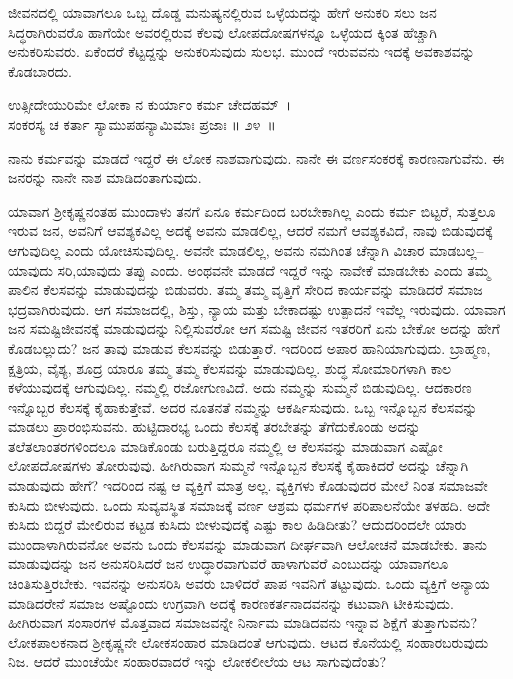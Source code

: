 ಜೀವನದಲ್ಲಿ ಯಾವಾಗಲೂ ಒಬ್ಬ ದೊಡ್ಡ ಮನುಷ್ಯನಲ್ಲಿರುವ ಒಳ್ಳೆಯದನ್ನು ಹೇಗೆ ಅನುಕರಿ ಸಲು ಜನ ಸಿದ್ಧರಾಗಿರುವರೊ ಹಾಗೆಯೇ ಅವರಲ್ಲಿರುವ ಕೆಲವು ಲೋಪದೋಷಗಳನ್ನೂ ಒಳ್ಳೆಯದ ಕ್ಕಿಂತ ಹೆಚ್ಚಾಗಿ ಅನುಕರಿಸುವರು. ಏಕೆಂದರೆ ಕೆಟ್ಟದ್ದನ್ನು ಅನುಕರಿಸುವುದು ಸುಲಭ. ಮುಂದೆ ಇರುವವನು ಇದಕ್ಕೆ ಅವಕಾಶವನ್ನು ಕೊಡಬಾರದು.

\begin{shloka}
ಉತ್ಸೀದೇಯುರಿಮೇ ಲೋಕಾ ನ ಕುರ್ಯಾಂ ಕರ್ಮ ಚೇದಹಮ್~।\\ಸಂಕರಸ್ಯ ಚ ಕರ್ತಾ ಸ್ಯಾಮುಪಹನ್ಯಾಮಿಮಾಃ ಪ್ರಜಾಃ \hfill॥ ೨೪~॥
\end{shloka}

\newpage

\begin{artha}
ನಾನು ಕರ್ಮವನ್ನು ಮಾಡದೆ ಇದ್ದರೆ ಈ ಲೋಕ ನಾಶವಾಗುವುದು. ನಾನೇ ಈ ವರ್ಣ\-ಸಂಕರಕ್ಕೆ ಕಾರಣನಾಗುವೆನು. ಈ ಜನರನ್ನು ನಾನೇ ನಾಶ ಮಾಡಿದಂತಾಗುವುದು.
\end{artha}

ಯಾವಾಗ ಶ‍್ರೀಕೃಷ್ಣನಂತಹ ಮುಂದಾಳು ತನಗೆ ಏನೂ ಕರ್ಮದಿಂದ ಬರಬೇಕಾಗಿಲ್ಲ ಎಂದು ಕರ್ಮ ಬಿಟ್ಟರೆ, ಸುತ್ತಲೂ ಇರುವ ಜನ, ಅವನಿಗೆ ಆವಶ್ಯಕವಿಲ್ಲ ಅದಕ್ಕೆ ಅವನು ಮಾಡಲಿಲ್ಲ, ಆದರೆ ನಮಗೆ ಆವಶ್ಯಕವಿದೆ, ನಾವು ಬಿಡುವುದಕ್ಕೆ ಆಗುವುದಿಲ್ಲ ಎಂದು ಯೋಚಿಸುವುದಿಲ್ಲ. ಅವನೇ ಮಾಡಲಿಲ್ಲ, ಅವನು ನಮಗಿಂತ ಚೆನ್ನಾಗಿ ವಿಚಾರ ಮಾಡಬಲ್ಲ–ಯಾವುದು ಸರಿ,\break ಯಾವುದು ತಪ್ಪು ಎಂದು. ಅಂಥವನೇ ಮಾಡದೆ ಇದ್ದರೆ ಇನ್ನು ನಾವೇಕೆ ಮಾಡಬೇಕು ಎಂದು ತಮ್ಮ ಪಾಲಿನ ಕೆಲಸವನ್ನು ಮಾಡುವುದನ್ನು ಬಿಡುವರು. ತಮ್ಮ ತಮ್ಮ ವೃತ್ತಿಗೆ ಸೇರಿದ ಕಾರ್ಯವನ್ನು ಮಾಡಿದರೆ ಸಮಾಜ ಭದ್ರವಾಗಿರುವುದು. ಆಗ ಸಮಾಜದಲ್ಲಿ, ಶಿಸ್ತು, ನ್ಯಾಯ ಮತ್ತು ಬೇಕಾದಷ್ಟು ಉತ್ಪಾದನೆ ಇವೆಲ್ಲ ಇರುವುದು. ಯಾವಾಗ ಜನ ಸಮಷ್ಟಿಜೀವನಕ್ಕೆ ಮಾಡುವುದನ್ನು ನಿಲ್ಲಿಸುವರೋ ಆಗ ಸಮಷ್ಟಿ ಜೀವನ ಇತರರಿಗೆ ಏನು ಬೇಕೋ ಅದನ್ನು ಹೇಗೆ ಕೊಡಬಲ್ಲುದು? ಜನ ತಾವು ಮಾಡುವ ಕೆಲಸವನ್ನು ಬಿಡುತ್ತಾರೆ. ಇದರಿಂದ ಅಪಾರ ಹಾನಿಯಾಗುವುದು. ಬ್ರಾಹ್ಮಣ, ಕ್ಷತ್ರಿಯ, ವೈಶ್ಯ, ಶೂದ್ರ ಯಾರೂ ತಮ್ಮ ತಮ್ಮ ಕೆಲಸವನ್ನು ಮಾಡುವುದಿಲ್ಲ. ಶುದ್ಧ ಸೋಮಾರಿಗಳಾಗಿ ಕಾಲ ಕಳೆಯುವುದಕ್ಕೆ ಆಗುವುದಿಲ್ಲ. ನಮ್ಮಲ್ಲಿ ರಜೋಗುಣವಿದೆ. ಅದು ನಮ್ಮನ್ನು ಸುಮ್ಮನೆ ಬಿಡುವುದಿಲ್ಲ. ಆದಕಾರಣ ಇನ್ನೊಬ್ಬರ ಕೆಲಸಕ್ಕೆ ಕೈಹಾಕುತ್ತೇವೆ. ಅದರ ನೂತನತೆ ನಮ್ಮನ್ನು ಆಕರ್ಷಿಸುವುದು. ಒಬ್ಬ ಇನ್ನೊಬ್ಬನ ಕೆಲಸವನ್ನು ಮಾಡಲು ಪ್ರಾರಂಭಿಸುವನು. ಹುಟ್ಟಿದಾರಭ್ಯ ಒಂದು ಕೆಲಸಕ್ಕೆ ತರಬೇತನ್ನು ತೆಗೆದುಕೊಂಡು ಅದನ್ನು ತಲೆತಲಾಂತರಗಳಿಂದಲೂ ಮಾಡಿಕೊಂಡು ಬರುತ್ತಿದ್ದರೂ ನಮ್ಮಲ್ಲಿ ಆ ಕೆಲಸವನ್ನು ಮಾಡುವಾಗ ಎಷ್ಟೋ ಲೋಪದೋಷಗಳು ತೋರುವುವು. ಹೀಗಿರುವಾಗ ಸುಮ್ಮನೆ ಇನ್ನೊಬ್ಬನ ಕೆಲಸಕ್ಕೆ ಕೈಹಾಕಿದರೆ ಅದನ್ನು ಚೆನ್ನಾಗಿ ಮಾಡುವುದು ಹೇಗೆ? ಇದರಿಂದ ನಷ್ಟ ಆ ವ್ಯಕ್ತಿಗೆ ಮಾತ್ರ ಅಲ್ಲ. ವ್ಯಕ್ತಿಗಳು ಕೊಡುವುದರ ಮೇಲೆ ನಿಂತ ಸಮಾಜವೇ ಕುಸಿದು ಬೀಳುವುದು. ಒಂದು ಸುವ್ಯವಸ್ಥಿತ ಸಮಾಜಕ್ಕೆ ವರ್ಣ ಆಶ್ರಮ ಧರ್ಮಗಳ ಪರಿಪಾಲನೆಯೇ ತಳಹದಿ. ಅದೇ ಕುಸಿದು ಬಿದ್ದರೆ ಮೇಲಿರುವ ಕಟ್ಟಡ ಕುಸಿದು ಬೀಳುವುದಕ್ಕೆ ಎಷ್ಟು ಕಾಲ ಹಿಡಿದೀತು? ಆದುದರಿಂದಲೇ ಯಾರು ಮುಂದಾಳಾಗಿರುವನೋ ಅವನು ಒಂದು ಕೆಲಸವನ್ನು ಮಾಡುವಾಗ ದೀರ್ಘವಾಗಿ ಆಲೋಚನೆ ಮಾಡಬೇಕು. ತಾನು ಮಾಡುವುದನ್ನು ಜನ ಅನುಸರಿಸಿದರೆ ಜನ ಉದ್ಧಾರವಾಗುವರೆ ಹಾಳಾಗುವರೆ ಎಂಬುದನ್ನು ಯಾವಾಗಲೂ ಚಿಂತಿಸುತ್ತಿರಬೇಕು. ಇವನನ್ನು ಅನುಸರಿಸಿ ಅವರು ಬಾಳಿದರೆ ಪಾಪ ಇವನಿಗೆ ತಟ್ಟುವುದು. ಒಂದು ವ್ಯಕ್ತಿಗೆ ಅನ್ಯಾಯ ಮಾಡಿದರೇನೆ ಸಮಾಜ ಅಷ್ಟೊಂದು ಉಗ್ರವಾಗಿ ಅದಕ್ಕೆ ಕಾರಣಕರ್ತನಾದವನನ್ನು ಕಟುವಾಗಿ ಟೀಕಿಸುವುದು. ಹೀಗಿರುವಾಗ ಸಂಸಾರಗಳ ಮೊತ್ತವಾದ ಸಮಾಜವನ್ನೇ ನಿರ್ನಾಮ ಮಾಡಿದವನು ಇನ್ನಾವ ಶಿಕ್ಷೆಗೆ ತುತ್ತಾಗುವನು? ಲೋಕಪಾಲಕನಾದ ಶ‍್ರೀಕೃಷ್ಣನೇ ಲೋಕಸಂಹಾರ ಮಾಡಿದಂತೆ ಆಗುವುದು. ಆಟದ ಕೊನೆಯಲ್ಲಿ ಸಂಹಾರ\break ಬರುವುದು ನಿಜ. ಆದರೆ ಮುಂಚೆಯೇ ಸಂಹಾರವಾದರೆ ಇನ್ನು ಲೋಕಲೀಲೆಯ ಆಟ ಸಾಗುವುದೆಂತು?

